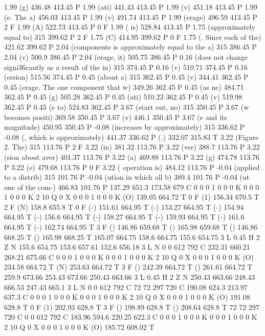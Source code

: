 1.99 (g) 436.48 413.45 P
1.99 (ati) 441.43 413.45 P
1.99 (v) 451.18 413.45 P
1.99 (e. The a) 456.03 413.45 P
1.99 (v) 491.74 413.45 P
1.99 (erage) 496.59 413.45 P
2 F
1.99 (A) 522.73 413.45 P
0 F
1.99 ( is) 528.84 413.45 P
1.75 (approximately equal to) 315 399.62 P
2 F
1.75 (C) 414.95 399.62 P
0 F
1.75 (. Since each of the) 421.62 399.62 P
2.04 (components is approximately equal to the a) 315 386.45 P
2.04 (v) 500.9 386.45 P
2.04 (erage, it) 505.75 386.45 P
0.16 (does not change signi\336cantly as a result of the in) 315 374.45 P
0.16 (v) 510.71 374.45 P
0.16 (ersion) 515.56 374.45 P
0.45 (about a) 315 362.45 P
0.45 (v) 344.41 362.45 P
0.45 (erage. The one component that w) 349.26 362.45 P
0.45 (as ne) 484.71 362.45 P
0.45 (g) 505.28 362.45 P
0.45 (ati) 510.23 362.45 P
0.45 (v) 519.98 362.45 P
0.45 (e to) 524.83 362.45 P
3.67 (start out, no) 315 350.45 P
3.67 (w becomes positi) 369.58 350.45 P
3.67 (v) 446.1 350.45 P
3.67 (e and its magnitude) 450.95 350.45 P
-0.08 (increases by approximately) 315 336.62 P
-0.08 (, which is approximately) 441.37 336.62 P
(.) 332.07 315.83 T
3.22 (Figure 2. The) 315 113.76 P
2 F
3.22 (in) 381.32 113.76 P
3.22 (ver) 388.7 113.76 P
3.22 (sion about aver) 401.37 113.76 P
3.22 (a) 469.88 113.76 P
3.22 (g) 474.78 113.76 P
3.22 (e) 479.68 113.76 P
0 F
3.22 ( operation is) 484.12 113.76 P
-0.04 (applied to a distrib) 315 101.76 P
-0.04 (ution in which all b) 389.4 101.76 P
-0.04 (ut one of the com-) 466.83 101.76 P
137.29 651.3 173.58 679 C
0 0 0 1 0 0 0 K
0 0 0 1 0 0 0 K
2 10 Q
0 X
0 0 0 1 0 0 0 K
(O) 139.05 664.72 T
0 F
(1) 156.34 670.5 T
2 F
(N) 158.8 655.8 T
0 F
(-) 151.61 664.95 T
(-) 153.27 664.95 T
(-) 154.94 664.95 T
(-) 156.6 664.95 T
(-) 158.27 664.95 T
(-) 159.93 664.95 T
(-) 161.6 664.95 T
(-) 162.74 664.95 T
3 F
() 146.86 659.68 T
() 165.98 659.68 T
() 146.86 668.25 T
() 165.98 668.25 T
165.07 664.75 158.6 664.75 155.6 654.75 3 L
0.45 H
2 Z
N
155.6 654.75 153.6 657.61 152.6 656.18 3 L
N
0 0 612 792 C
232.31 660.21 268.21 675.66 C
0 0 0 1 0 0 0 K
0 0 0 1 0 0 0 K
2 10 Q
0 X
0 0 0 1 0 0 0 K
(O) 234.58 664.72 T
(N) 253.63 664.72 T
3 F
() 242.39 664.72 T
() 261.61 664.72 T
259.9 673.66 253.43 673.66 250.43 663.66 3 L
0.45 H
2 Z
N
250.43 663.66 248.43 666.53 247.43 665.1 3 L
N
0 0 612 792 C
72 72 297 720 C
190.08 624.3 213.97 637.3 C
0 0 0 1 0 0 0 K
0 0 0 1 0 0 0 K
2 10 Q
0 X
0 0 0 1 0 0 0 K
(O) 191.08 628.8 T
0 F
(1) 202.93 628.8 T
3 F
() 198.89 628.8 T
() 208.64 628.8 T
72 72 297 720 C
0 0 612 792 C
183.96 594.6 220.25 622.3 C
0 0 0 1 0 0 0 K
0 0 0 1 0 0 0 K
2 10 Q
0 X
0 0 0 1 0 0 0 K
(O) 185.72 608.02 T
